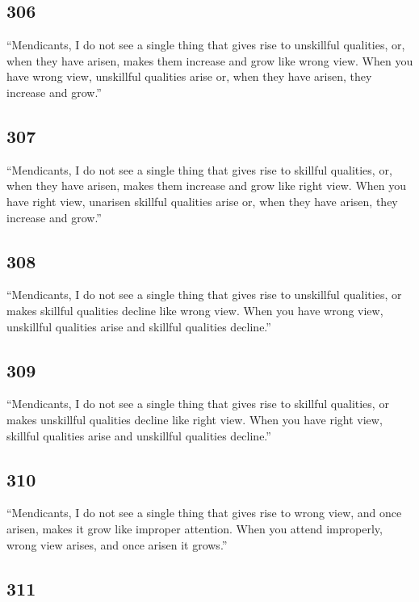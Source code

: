\documentclass[12pt,openany]{book}%
\begin{document}
\subsection*{306 }

“Mendicants, I do not see a single thing that gives rise to unskillful qualities, or, when they have arisen, makes them increase and grow like wrong view. When you have wrong view, unskillful qualities arise or, when they have arisen, they increase and grow.” 

\subsection*{307 }

“Mendicants, I do not see a single thing that gives rise to skillful qualities, or, when they have arisen, makes them increase and grow like right view. When you have right view, unarisen skillful qualities arise or, when they have arisen, they increase and grow.” 

\subsection*{308 }

“Mendicants, I do not see a single thing that gives rise to unskillful qualities, or makes skillful qualities decline like wrong view. When you have wrong view, unskillful qualities arise and skillful qualities decline.” 

\subsection*{309 }

“Mendicants, I do not see a single thing that gives rise to skillful qualities, or makes unskillful qualities decline like right view. When you have right view, skillful qualities arise and unskillful qualities decline.” 

\subsection*{310 }

“Mendicants, I do not see a single thing that gives rise to wrong view, and once arisen, makes it grow like improper attention. When you attend improperly, wrong view arises, and once arisen it grows.” 

\subsection*{311 }
\end{document}
